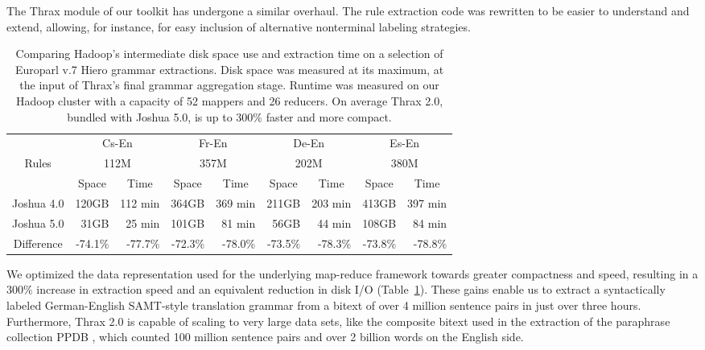 \documentclass[11pt]{article}
\begin{document}
The Thrax module of our toolkit has undergone a similar overhaul. The
rule extraction code was rewritten to be easier to understand and
extend, allowing, for instance, for easy inclusion of alternative
nonterminal labeling strategies.

\begin{table}[t]
  \begin{center}
    \begin{tabular}{|c|r|r|r|r|r|r|r|r|}
      \hline
      & \multicolumn{2}{c|}{Cs-En} & \multicolumn{2}{c|}{Fr-En} &
      \multicolumn{2}{c|}{De-En} & \multicolumn{2}{c|}{Es-En} \\

      Rules & \multicolumn{2}{c|}{112M} & \multicolumn{2}{c|}{357M} &
      \multicolumn{2}{c|}{202M} & \multicolumn{2}{c|}{380M} \\

      \hline

      & \multicolumn{1}{c|}{Space} & \multicolumn{1}{c|}{Time} &
      \multicolumn{1}{c|}{Space} & \multicolumn{1}{c|}{Time}  &
      \multicolumn{1}{c|}{Space} & \multicolumn{1}{c|}{Time}  &
      \multicolumn{1}{c|}{Space} &  \multicolumn{1}{c|}{Time} \\
      \hline
      \hline
      Joshua 4.0 & 120GB & 112 min & 364GB & 369 min & 211GB & 203 min & 413GB & 397 min \\
      \hline
      Joshua 5.0 & 31GB  & 25 min & 101GB  & 81 min & 56GB  & 44 min & 108GB & 84 min \\
      \hline
      \hline
      Difference & -74.1\% & -77.7\%  & -72.3\% & -78.0\%  & -73.5\% & -78.3\%  & -73.8\% & -78.8\% \\
      \hline
    \end{tabular}
  \end{center}
  \caption{Comparing Hadoop's intermediate disk space use and
    extraction time on a selection of Europarl v.7 Hiero grammar
    extractions. Disk space was measured at its maximum, at
    the input of Thrax's final grammar aggregation stage. Runtime was
    measured on our Hadoop cluster with a capacity of 52 mappers and
    26 reducers. On average Thrax 2.0, bundled with Joshua 5.0,
    is up to 300\% faster and more compact.}
  \label{tab-thrax-speed}
\end{table}

We optimized the data representation used for the underlying
map-reduce framework towards greater compactness and speed, resulting
in a 300\% increase in extraction speed and an equivalent reduction in
disk I/O (Table~\ref{tab-thrax-speed}).  These gains enable us to
extract a syntactically labeled German-English SAMT-style translation grammar
from a bitext of over 4 million sentence pairs in just over three
hours.  Furthermore, Thrax 2.0 is capable of scaling to very large data
sets, like the composite bitext used in the extraction of the
paraphrase collection PPDB \cite{PPDB}, which counted 100 million
sentence pairs and over 2 billion words on the English side.
\end{document}
